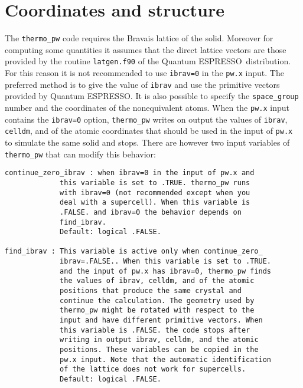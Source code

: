 \documentclass[12pt,a4paper,twoside]{report}
\def\qe{{\sc Quantum ESPRESSO}}
\begin{document}
\newpage
{\color{coral}\section{Coordinates and structure}}
\color{black}
The \texttt{thermo\_pw} code requires the Bravais lattice of the solid. 
Moreover for computing some quantities it assumes that the direct lattice 
vectors are those provided by the routine \texttt{latgen.f90} of the \qe\ 
distribution. 
For this reason it is not recommended to use \texttt{ibrav=0} in the
\texttt{pw.x} input. The preferred method is to give the value of 
\texttt{ibrav} and use the primitive vectors provided by \qe.
It is also possible to specify the \texttt{space\_group} number and 
the coordinates of the nonequivalent atoms. When the 
\texttt{pw.x} input contains the \texttt{ibrav=0} option, 
\texttt{thermo\_pw} writes on output
the values of \texttt{ibrav}, \texttt{celldm}, and of the atomic coordinates
that should be used in the input of \texttt{pw.x} to simulate the same 
solid and stops. There are however two input variables of \texttt{thermo\_pw} 
that can modify this behavior:

\begin{verbatim}
continue_zero_ibrav : when ibrav=0 in the input of pw.x and 
             this variable is set to .TRUE. thermo_pw runs 
             with ibrav=0 (not recommended except when you 
             deal with a supercell). When this variable is 
             .FALSE. and ibrav=0 the behavior depends on 
             find_ibrav.
             Default: logical .FALSE.

find_ibrav : This variable is active only when continue_zero_
             ibrav=.FALSE.. When this variable is set to .TRUE. 
             and the input of pw.x has ibrav=0, thermo_pw finds 
             the values of ibrav, celldm, and of the atomic 
             positions that produce the same crystal and 
             continue the calculation. The geometry used by 
             thermo_pw might be rotated with respect to the 
             input and have different primitive vectors. When 
             this variable is .FALSE. the code stops after 
             writing in output ibrav, celldm, and the atomic 
             positions. These variables can be copied in the 
             pw.x input. Note that the automatic identification 
             of the lattice does not work for supercells.
             Default: logical .FALSE.
\end{verbatim}
\end{document}
